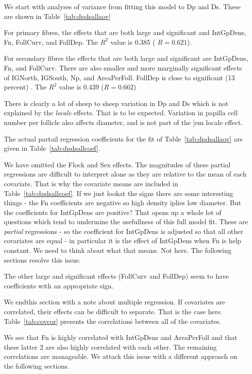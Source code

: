 \documentclass[titlepage]{article}  %
\begin{document}
We start with analyses of variance from fitting this model to Dp and Ds. These are shown in Table~\ref{tab:dpdsallaov}

For primary fibres, the effects that are both large and significant and IntGpDens, Fn, FollCurv, and FollDep. The $R^{2}$ value is 0.385 ( $R = 0.621$).

For secondary fibres the effects that are both large and significant are IntGpDens, Fn, and FollCurv. There are also smaller and more marginally significant effects of IGNorth, IGSouth, Np, and AreaPerFoll. FollDep is close to significant (13 percent)  . The $R^{2}$ value is 0.439 ($R = 0.662$)

There is clearly a lot of sheep to sheep variation in Dp and Ds which is not explained by the {\em locale} effects. That is to be expected. Variation in papilla cell number per follicle also affects diameter, and is not part of the {]em locale} effect.

The actual partail regression coefficients for the fit of Table~\ref{tab:dpdsallaov} are given in Table~\ref{tab:dpdsallcoef}.

We have omitted the Flock and Sex effects.  The magnitudes of these partial regressions are difficult to interpret alone as they are relative to the mean of each covariate. That is why the covariate means are included in Table~\ref{tab:dpdsallcoef}. If we just lookat the signs there are some interesting things - the Fn coefficients are negative so high density iplies low diameter. But the coefficients for IntGpDens are positive? That opens up a whole lot of questions which tend to undermine the usefullness of this full model fit. These are {\em partial} regressions - so the coefficient for IntGpDens is adjusted so that all other covariates are equal - in particular it is the effect of IntGpDens when Fn is help constant. We need to think about what that means.  Not here. The following sections resolve this issue. 

The other large and significant effects (FollCurv and FollDep) seem to have coefficients with an appropriate sign.

We endthis section with a note about multiple regression. If covariates are correlated, their effects can be difficult to separate. That is the case here. Table~\ref{tab:covcor} presents the correlations between all of the covariates.

We see that Fn is highly correlated with IntGpDens and AreaPerFoll and that these latter 2 are also highly correlated with each other. The remaining correlations are manageable. We attack this issue with a different approach on the following sections.
\end{document}
